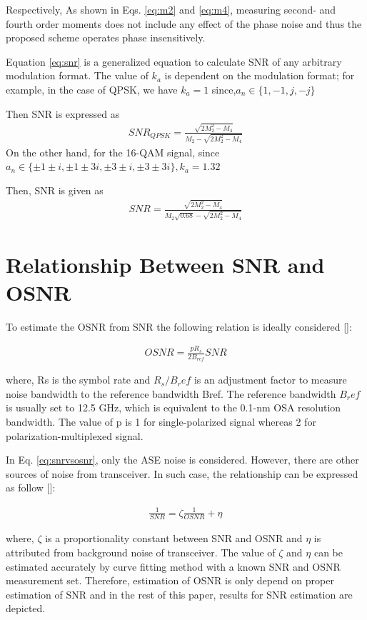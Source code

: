 \documentclass[12pt]{report}
\begin{document}
Respectively, As shown in Eqs. \ref{eq:m2} and \ref{eq:m4}, measuring second- and fourth order moments does not include any effect of the phase noise and thus the proposed scheme operates phase insensitively.

Equation \ref{eq:snr} is a generalized equation to calculate SNR of any arbitrary modulation format. The value of $k_a$ is dependent on the modulation format; for example, in the case of QPSK, we have $k_a=1$ since,$a_n\in\{1,-1,j,-j\}$

Then SNR is expressed as
\begin{align}
	SNR_{QPSK}=\frac{\sqrt{2M_2^2 -M_4}}{M_2-\sqrt{2M_2^2 -M_4}}
\end{align}
On the other hand, for the 16-QAM signal, since $a_n\in\{\pm 1 \pm i, \pm 1 \pm 3i, \pm 3 \pm i, \pm 3 \pm 3i\}, k_a=1.32$

Then, SNR is given as
\begin{align}\label{eq:snr16qam}
SNR=\frac{\sqrt{2M_2^2 -M_4}}{M_2\sqrt{0.68}-\sqrt{2M_2^2 -M_4}}
\end{align}

\section{Relationship Between SNR and OSNR}
To estimate the OSNR from SNR the following relation is ideally considered []:

\begin{align}\label{eq:snrvsosnr}
OSNR=\frac{p R_s}{2 B_{ref}}SNR
\end{align}

where, Rs is the symbol rate and $R_s/B_ref$ is an adjustment factor to measure noise bandwidth to the reference bandwidth Bref. The reference bandwidth $B_ref$ is usually set to 12.5 GHz, which is equivalent to the 0.1-nm OSA resolution bandwidth. The value of p is 1 for single-polarized signal whereas 2 for polarization-multiplexed signal.

In Eq. \ref{eq:snrvsosnr}, only the ASE noise is considered. However, there are other sources of noise from transceiver. In such case, the relationship can be expressed as follow []:

\begin{align}\label{eq:snrvsosnr2}
\frac{1}{SNR}=\zeta \frac{1}{OSNR}+\eta
\end{align}

where, $\zeta$ is a proportionality constant between SNR and OSNR and $\eta$ is attributed from background noise of transceiver. The value of $\zeta$ and $\eta$ can be estimated accurately by curve fitting method with a known SNR and OSNR measurement set. Therefore, estimation of OSNR is only depend on proper estimation of SNR and in the rest of this paper, results for SNR estimation are depicted.
\end{document}
